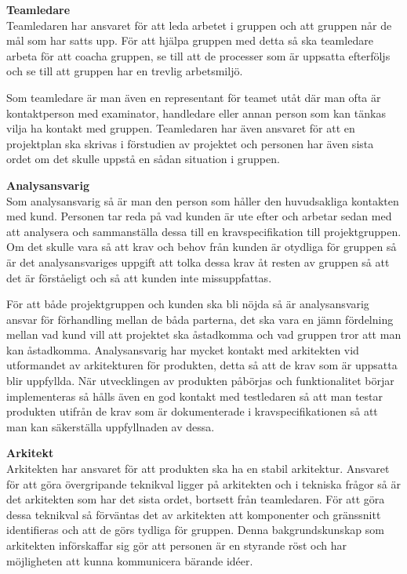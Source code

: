 \documentclass[a4paper,10pt]{article}
\begin{document}
\textbf{Teamledare}\\
Teamledaren har ansvaret för att leda arbetet i gruppen och att gruppen når de mål som har satts upp. För att hjälpa gruppen med detta så ska teamledare arbeta för att coacha gruppen, se till att de processer som är uppsatta efterföljs och se till att gruppen har en trevlig arbetsmiljö.

Som teamledare är man även en representant för teamet utåt där man ofta är kontaktperson med examinator, handledare eller annan person som kan tänkas vilja ha kontakt med gruppen. Teamledaren har även ansvaret för att en projektplan ska skrivas i förstudien av projektet och personen har även sista ordet om det skulle uppstå en sådan situation i gruppen.

\textbf{Analysansvarig}\\
Som analysansvarig så är man den person som håller den huvudsakliga kontakten med kund. Personen tar reda på vad kunden är ute efter och arbetar sedan med att analysera och sammanställa dessa till en kravspecifikation till projektgruppen. Om det skulle vara så att krav och behov från kunden är otydliga för gruppen så är det analysansvariges uppgift att tolka dessa krav åt resten av gruppen så att det är förståeligt och så att kunden inte missuppfattas.

För att både projektgruppen och kunden ska bli nöjda så är analysansvarig ansvar för förhandling mellan de båda parterna, det ska vara en jämn fördelning mellan vad kund vill att projektet ska åstadkomma och vad gruppen tror att man kan åstadkomma. Analysansvarig har mycket kontakt med arkitekten vid utformandet av arkitekturen för produkten, detta så att de krav som är uppsatta blir uppfyllda. När utvecklingen av produkten påbörjas och funktionalitet börjar implementeras så hålls även en god kontakt med testledaren så att man testar produkten utifrån de krav som är dokumenterade i kravspecifikationen så att man kan säkerställa uppfyllnaden av dessa.

\textbf{Arkitekt}\\
Arkitekten har ansvaret för att produkten ska ha en stabil arkitektur. Ansvaret för att göra övergripande teknikval ligger på arkitekten och i tekniska frågor så är det arkitekten som har det sista ordet, bortsett från teamledaren. För att göra dessa teknikval så förväntas det av arkitekten att komponenter och gränssnitt identifieras och att de görs tydliga för gruppen. Denna bakgrundskunskap som arkitekten införskaffar sig gör att personen är en styrande röst och har möjligheten att kunna kommunicera bärande idéer.
\end{document}
